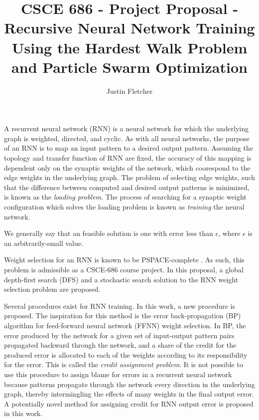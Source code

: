 \documentclass[12pt]{article}
\begin{document}
	
	\title{CSCE 686 - Project Proposal - Recursive Neural Network Training Using the Hardest Walk Problem and Particle Swarm Optimization}
	\author{Justin Fletcher}
	\maketitle
	
	
	A recurrent neural network (RNN) is a neural network for which the underlying graph is weighted, directed, and cyclic. As with all neural networks, the purpose of an RNN is to map an input pattern to a desired output pattern. Assuming the topology and transfer function of RNN are fixed, the accuracy of this mapping is dependent only on the synaptic weights of the network, which coorespond to the edge weights in the underlying graph. The problem of selecting edge weights, such that the difference between computed and desired output patterns is minimized, is known as the \emph{loading problem}. The process of searching for a synaptic weight configuration which solves the loading problem is known as \emph{training} the neural network.
	
	We generally say that an feasible solution is one with error less than $\epsilon$, where $\epsilon$ is an arbitrarily-small value. 
	
	Weight selection for an RNN is known to be PSPACE-complete \cite{wiedermann1989computational_efficiency_of_symmetric_neural_networks}. As such, this problem is admissible as a CSCE-686 course project. In this proposal, a global depth-first search (DFS) and a stochastic search solution to the RNN weight selection problem are proposed.
	
	Several procedures exist for RNN training. In this work, a new procedure is proposed. The inspiration for this method is the error back-propagation (BP) algorithm for feed-forward neural network (FFNN) weight selection. In BP, the error produced by the network for a given set of input-output pattern pairs propagated backward through the network, and a share of the credit for the produced error is allocated to each of the weights according to its responsibility for the error. This is called the \textit{credit assignment problem}. It is not possible to use this procedure to assign blame for errors in a recurrent neural network because patterns propagate through the network every direction in the underlying graph, thereby intermingling the effects of many weights in the final output error. A potentially novel method for assigning credit for RNN output error is proposed in this work.
	
\end{document}

